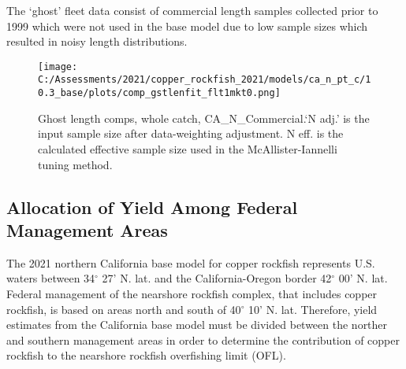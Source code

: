 \documentclass[11pt,
  english,
  a4paper,
]{article}
\begin{document}

The `ghost' fleet data consist of commercial length samples collected prior to 1999 which were not used in the base model due to low sample sizes which resulted in noisy length distributions.

\leavevmode\tagmcend\tagstructend\par


\begin{figure}
\centering
\texttt{[image: C:/Assessments/2021/copper\_rockfish\_2021/models/ca\_n\_pt\_c/10.3\_base/plots/comp\_gstlenfit\_flt1mkt0.png]}
\caption{Ghost length comps, whole catch, CA\_N\_Commercial.`N adj.' is the input sample size after data-weighting adjustment. N eff. is the calculated effective sample size used in the McAllister-Iannelli tuning method.\label{fig:comp_gstlenfit_flt1mkt0}}
\end{figure}

\tagmcend\tagstructend


\hypertarget{allocation-of-yield-among-federal-management-areas}{%
\subsection{Allocation of Yield Among Federal Management Areas}\label{allocation-of-yield-among-federal-management-areas}}

\leavevmode\tagmcend\tagstructend


The 2021 northern California base model for copper rockfish represents U.S. waters between 34{\(^\circ\)\leavevmode\tagmcend\tagstructend} 27' N. lat. and the California-Oregon border 42{\(^\circ\)\leavevmode\tagmcend\tagstructend} 00' N. lat. Federal management of the nearshore rockfish complex, that includes copper rockfish, is based on areas north and south of 40{\(^\circ\)\leavevmode\tagmcend\tagstructend} 10' N. lat. Therefore, yield estimates from the California base model must be divided between the norther and southern management areas in order to determine the contribution of copper rockfish to the nearshore rockfish overfishing limit (OFL).
\end{document}
